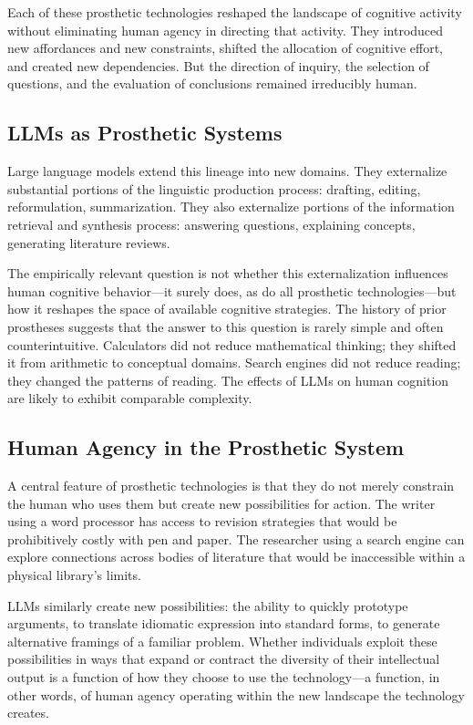 \documentclass[12pt,a4paper]{article}
\theoremstyle{definition}
\theoremstyle{plain}
\theoremstyle{remark}
\begin{document}
Each of these prosthetic technologies reshaped the landscape of cognitive activity without
eliminating human agency in directing that activity. They introduced new affordances and
new constraints, shifted the allocation of cognitive effort, and created new dependencies.
But the direction of inquiry, the selection of questions, and the evaluation of conclusions
remained irreducibly human.

\subsection{LLMs as Prosthetic Systems}

Large language models extend this lineage into new domains. They externalize substantial
portions of the linguistic production process: drafting, editing, reformulation,
summarization. They also externalize portions of the information retrieval and synthesis
process: answering questions, explaining concepts, generating literature reviews.

The empirically relevant question is not whether this externalization influences human
cognitive behavior---it surely does, as do all prosthetic technologies---but how it reshapes
the space of available cognitive strategies. The history of prior prostheses suggests that
the answer to this question is rarely simple and often counterintuitive. Calculators did
not reduce mathematical thinking; they shifted it from arithmetic to conceptual domains.
Search engines did not reduce reading; they changed the patterns of reading. The effects
of LLMs on human cognition are likely to exhibit comparable complexity.

\subsection{Human Agency in the Prosthetic System}

A central feature of prosthetic technologies is that they do not merely constrain the
human who uses them but create new possibilities for action. The writer using a word
processor has access to revision strategies that would be prohibitively costly with pen and
paper. The researcher using a search engine can explore connections across bodies of
literature that would be inaccessible within a physical library's limits.

LLMs similarly create new possibilities: the ability to quickly prototype arguments, to
translate idiomatic expression into standard forms, to generate alternative framings of a
familiar problem. Whether individuals exploit these possibilities in ways that expand or
contract the diversity of their intellectual output is a function of how they choose to use
the technology---a function, in other words, of human agency operating within the new
landscape the technology creates.
\end{document}
